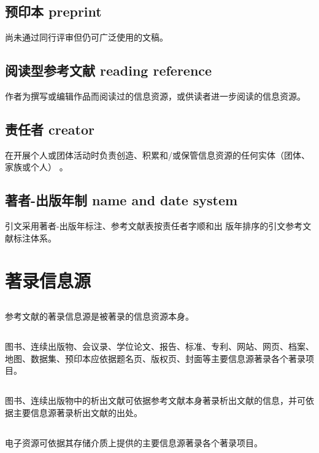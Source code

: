 \documentclass[twoside]{article}%
\begin{document}
{\subsection{预印本 preprint}
尚未通过同行评审但仍可广泛使用的文稿。


\subsection{阅读型参考文献 reading reference}
作者为撰写或编辑作品而阅读过的信息资源，或供读者进一步阅读的信息资源。

\subsection{责任者 creator}\label{sec:concept:creator}
在开展个人或团体活动时负责创造、积累和/或保管信息资源的任何实体（团体、家族或个人） 。


\subsection{著者-出版年制 name and date system}
引文采用著者-出版年标注、参考文献表按责任者字顺和出
版年排序的引文参考文献标注体系。

}

\section{著录信息源}\label{sec:info:src}

{
\renewcommand\addcontentsline[3]{}
\subsection{} 参考文献的著录信息源是被著录的信息资源本身。

\subsection{} 图书、连续出版物、会议录、学位论文、报告、标准、专利、网站、网页、档案、地图、数据集、预印本应依据题名页、版权页、封面等主要信息源著录各个著录项目。

\subsection{}\label{sec:book:lianxu} 图书、连续出版物中的析出文献可依据参考文献本身著录析出文献的信息，并可依据主要信息源著录析出文献的出处。

\subsection{}\label{sec:no:e} 电子资源可依据其存储介质上提供的主要信息源著录各个著录项目。

}
\end{document}
